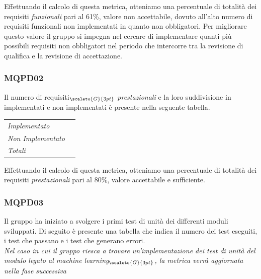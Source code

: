 {{{{{{Effettuando il calcolo di questa metrica, otteniamo una percentuale di totalità dei requisiti \textit{funzionali} pari al 61\%, valore non accettabile, dovuto all'alto numero di requisiti funzionali non implementati in quanto non obbligatori. Per migliorare questo valore il gruppo si impegna nel cercare di implementare quanti più possibili requisiti non obbligatori nel periodo che intercorre tra la revisione di qualifica e la revisione di accettazione.

\subsubsection{MQPD02}\label{ResocontoAttivitàDiVerificaRevisioneDiQualificaVerificheDiProcessoMQPD02}

Il numero di requisiti$_{\scaleto{G}{3pt}}$ \textit{prestazionali} e la loro suddivisione in implementati e non implementati è presente nella seguente tabella.

\quad
\def\tabularxcolumn#1{m{#1}}
{
	\begin{center}
		\renewcommand{\arraystretch}{1.4}
		\begin{longtable}[c]{|p{4cm}|p{3cm}|}
			\hline
			\rowcolor{airforceblue}
			\makecell[c]{\textbf{Realizzazione}} & \makecell[c]{\textbf{Quantità}}\\
			\hline
			\textit{Implementato} & \makecell[c]{3}\\
			\hline
			\textit{Non Implementato} & \makecell[c]{2} \\
			\hline
			\textit{Totali} & \makecell[c]{5} \\
		\end{longtable}
	\end{center}

Effettuando il calcolo di questa metrica, otteniamo una percentuale di totalità dei requisiti \textit{prestazionali} pari al 80\%, valore accettabile e sufficiente.

\subsubsection{MQPD03}\label{ResocontoAttivitàDiVerificaRevisioneDiQualificaVerificheDiProcessoMQPD03}

Il gruppo ha iniziato a svolgere i primi test di unità dei differenti moduli sviluppati. Di seguito è presente una tabella che indica il numero dei test eseguiti, i test che passano e i test che generano errori.\\
\textit{Nel caso in cui il gruppo riesca a trovare un'implementazione dei test di unità del modulo legato al machine learning$_{\scaleto{G}{3pt}}$, la metrica verrà aggiornata nella fase successiva}

}}}}}}}
